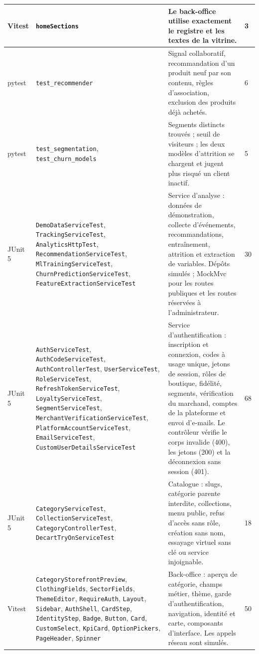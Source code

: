 \begin{longtable}{|p{2.4cm}|p{4.2cm}|p{7cm}|p{1.2cm}|}
\hline
Vitest & \texttt{homeSections} & Le back-office utilise exactement le registre et les textes de la vitrine. & 3 \\
\hline
pytest & \texttt{test\_recommender} & Signal collaboratif, recommandation d'un produit neuf par son contenu, règles d'association, exclusion des produits déjà achetés. & 6 \\
\hline
pytest & \texttt{test\_segmentation}, \texttt{test\_churn\_models} & Segments distincts trouvés ; seuil de visiteurs ; les deux modèles d'attrition se chargent et jugent plus risqué un client inactif. & 5 \\
\hline
JUnit 5 & \texttt{DemoDataServiceTest}, \texttt{TrackingServiceTest}, \texttt{AnalyticsHttpTest}, \texttt{RecommendationServiceTest}, \texttt{MlTrainingServiceTest}, \texttt{ChurnPredictionServiceTest}, \texttt{FeatureExtractionServiceTest} & Service d'analyse : données de démonstration, collecte d'événements, recommandations, entraînement, attrition et extraction de variables. Dépôts simulés ; MockMvc pour les routes publiques et les routes réservées à l'administrateur. & 30 \\
\hline
JUnit 5 & \texttt{AuthServiceTest}, \texttt{AuthCodeServiceTest}, \texttt{AuthControllerTest}, \texttt{UserServiceTest}, \texttt{RoleServiceTest}, \texttt{RefreshTokenServiceTest}, \texttt{LoyaltyServiceTest}, \texttt{SegmentServiceTest}, \texttt{MerchantVerificationServiceTest}, \texttt{PlatformAccountServiceTest}, \texttt{EmailServiceTest}, \texttt{CustomUserDetailsServiceTest} & Service d'authentification : inscription et connexion, codes à usage unique, jetons de session, rôles de boutique, fidélité, segments, vérification du marchand, comptes de la plateforme et envoi d'e-mails. Le contrôleur vérifie le corps invalide (400), les jetons (200) et la déconnexion sans session (401). & 68 \\
\hline
JUnit 5 & \texttt{CategoryServiceTest}, \texttt{CollectionServiceTest}, \texttt{CategoryControllerTest}, \texttt{DecartTryOnServiceTest} & Catalogue : slugs, catégorie parente interdite, collections, menu public, refus d'accès sans rôle, création sans nom, essayage virtuel sans clé ou service injoignable. & 18 \\
\hline
Vitest & \texttt{CategoryStorefrontPreview}, \texttt{ClothingFields}, \texttt{SectorFields}, \texttt{ThemeEditor}, \texttt{RequireAuth}, \texttt{Layout}, \texttt{Sidebar}, \texttt{AuthShell}, \texttt{CardStep}, \texttt{IdentityStep}, \texttt{Badge}, \texttt{Button}, \texttt{Card}, \texttt{CustomSelect}, \texttt{KpiCard}, \texttt{OptionPickers}, \texttt{PageHeader}, \texttt{Spinner} & Back-office : aperçu de catégorie, champs métier, thème, garde d'authentification, navigation, identité et carte, composants d'interface. Les appels réseau sont simulés. & 50 \\

\end{longtable}
